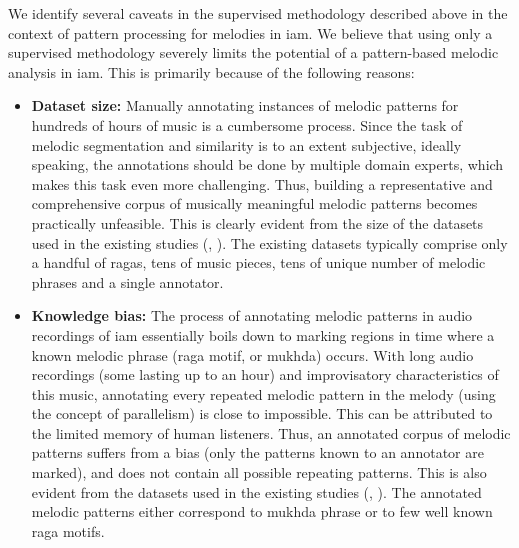 We identify several caveats in the supervised methodology described above in the context of pattern processing for melodies in \gls{iam}. We believe that using only a supervised methodology severely limits the potential of a pattern-based melodic analysis in \gls{iam}. This is primarily because of the following reasons:

\begin{itemize}
	\item \textbf{Dataset size:} Manually annotating instances of melodic patterns for hundreds of hours of music is a cumbersome process. Since the task of melodic segmentation and similarity is to an extent subjective, ideally speaking, the annotations should be done by multiple domain experts, which makes this task even more challenging. Thus, building a representative and comprehensive corpus of musically meaningful melodic patterns becomes practically unfeasible. This is clearly evident from the size of the datasets used in the existing studies (, ). The existing datasets typically comprise only a handful of \glspl{raga}, tens of music pieces, tens of unique number of melodic phrases and a single annotator.

	\item \textbf{Knowledge bias:} The process of annotating melodic patterns in audio recordings of \gls{iam} essentially boils down to marking regions in time where a known melodic phrase (\gls{raga} motif, or \gls{mukhda}) occurs. With long audio recordings (some lasting up to an hour) and improvisatory characteristics of this music, annotating every repeated melodic pattern in the melody (using the concept of parallelism) is close to impossible. This can be attributed to the limited memory of human listeners. Thus, an annotated corpus of melodic patterns suffers from a bias (only the patterns known to an annotator are marked), and does not contain all possible repeating patterns. This is also evident from the datasets used in the existing studies (, ). The annotated melodic patterns either correspond to \gls{mukhda} phrase or to few well known \gls{raga} motifs. 
	

\end{itemize}
